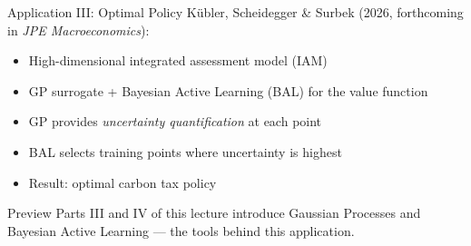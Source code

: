 \documentclass[aspectratio=169,11pt]{beamer}
\newcommand{\emphc}[1]{\textcolor{harvardcrimson}{#1}}
\begin{document}
\begin{frame}{Application III: Optimal Policy}
K\"ubler, Scheidegger \& Surbek (2026, forthcoming in \emph{JPE Macroeconomics}):

\vspace{0.3cm}
\begin{itemize}
  \item High-dimensional integrated assessment model (IAM)
  \item \emphc{GP surrogate + Bayesian Active Learning (BAL)} for the value function
  \item GP provides \emph{uncertainty quantification} at each point
  \item BAL selects training points where uncertainty is highest
  \item Result: optimal carbon tax policy
\end{itemize}

\vspace{0.3cm}
\begin{alertblock}{Preview}
Parts III and IV of this lecture introduce \emphc{Gaussian Processes} and \emphc{Bayesian Active Learning} --- the tools behind this application.
\end{alertblock}
\end{frame}
\end{document}
